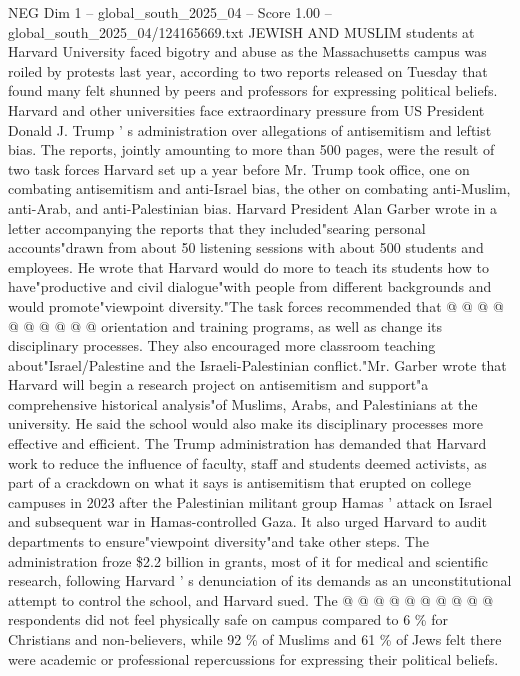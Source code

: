 \begin{textsample}{NEG Dim 1 – global\_south\_2025\_04 – Score 1.00 – global\_south\_2025\_04/124165669.txt}  \label{ex:f1_neg_164}
JEWISH AND MUSLIM students at Harvard University faced bigotry and abuse as the Massachusetts campus was roiled by protests last year, according to two reports released on Tuesday that found many felt shunned by peers and professors for expressing political beliefs.
Harvard and other universities face extraordinary pressure from US President Donald J.
Trump ' s administration over allegations of antisemitism and leftist bias.
The reports, jointly amounting to more than 500 pages, were the result of two task forces Harvard set up a year before Mr.
Trump took office, one on combating antisemitism and anti-Israel bias, the other on combating anti-Muslim, anti-Arab, and anti-Palestinian bias.
Harvard President Alan Garber wrote in a letter accompanying the reports that they included"searing personal accounts"drawn from about 50 listening sessions with about 500 students and employees.
He wrote that Harvard would do more to teach its students how to have"productive and civil dialogue"with people from different backgrounds and would promote"viewpoint diversity."The task forces recommended that @ @ @ @ @ @ @ @ @ @ orientation and training programs, as well as change its disciplinary processes.
They also encouraged more classroom teaching about"Israel/Palestine and the Israeli-Palestinian conflict."Mr.
Garber wrote that Harvard will begin a research project on antisemitism and support"a comprehensive historical analysis"of Muslims, Arabs, and Palestinians at the university.
He said the school would also make its disciplinary processes more effective and efficient.
The Trump administration has demanded that Harvard work to reduce the influence of faculty, staff and students deemed activists, as part of a crackdown on what it says is antisemitism that erupted on college campuses in 2023 after the Palestinian militant group Hamas ' attack on Israel and subsequent war in Hamas-controlled Gaza.
It also urged Harvard to audit departments to ensure"viewpoint diversity"and take other steps.
The administration froze \$2.2 billion in grants, most of it for medical and scientific research, following Harvard ' s denunciation of its demands as an unconstitutional attempt to control the school, and Harvard sued.
The @ @ @ @ @ @ @ @ @ @ respondents did not feel physically safe on campus compared to 6 \% for Christians and non-believers, while 92 \% of Muslims and 61 \% of Jews felt there were academic or professional repercussions for expressing their political beliefs.

\end{textsample}
